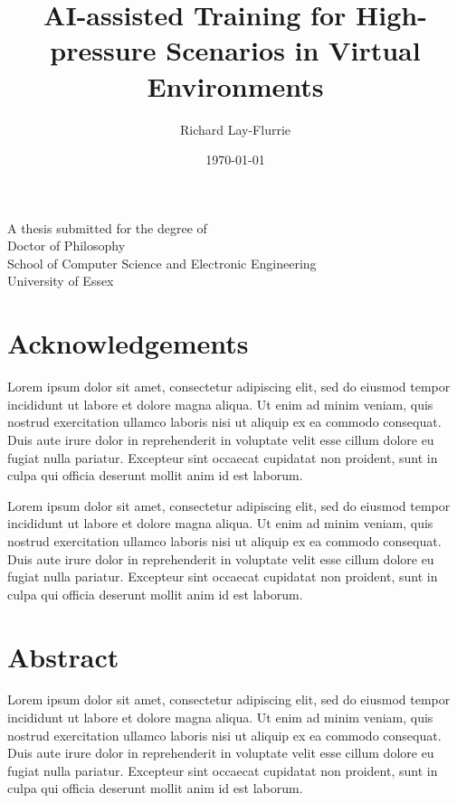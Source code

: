 \documentclass[12pt]{article}
\title{AI-assisted Training for High-pressure Scenarios in Virtual Environments}
\author{Richard Lay-Flurrie}
\date{\today}
\begin{document}
\maketitle
\thispagestyle{empty}

\begin{center}
  \vfill
  \large
  A thesis submitted for the degree of\\
  Doctor of Philosophy\\
  \vfill
  \normalsize
  School of Computer Science and Electronic Engineering\\
  University of Essex\\
  \vfill
\end{center}

\newpage

\section*{Acknowledgements}

Lorem ipsum dolor sit amet, consectetur adipiscing elit, sed do eiusmod tempor incididunt ut labore et dolore magna aliqua. Ut enim ad minim veniam, quis nostrud exercitation ullamco laboris nisi ut aliquip ex ea commodo consequat. Duis aute irure dolor in reprehenderit in voluptate velit esse cillum dolore eu fugiat nulla pariatur. Excepteur sint occaecat cupidatat non proident, sunt in culpa qui officia deserunt mollit anim id est laborum.

Lorem ipsum dolor sit amet, consectetur adipiscing elit, sed do eiusmod tempor incididunt ut labore et dolore magna aliqua. Ut enim ad minim veniam, quis nostrud exercitation ullamco laboris nisi ut aliquip ex ea commodo consequat. Duis aute irure dolor in reprehenderit in voluptate velit esse cillum dolore eu fugiat nulla pariatur. Excepteur sint occaecat cupidatat non proident, sunt in culpa qui officia deserunt mollit anim id est laborum.

\newpage

\section*{Abstract}

Lorem ipsum dolor sit amet, consectetur adipiscing elit, sed do eiusmod tempor incididunt ut labore et dolore magna aliqua. Ut enim ad minim veniam, quis nostrud exercitation ullamco laboris nisi ut aliquip ex ea commodo consequat. Duis aute irure dolor in reprehenderit in voluptate velit esse cillum dolore eu fugiat nulla pariatur. Excepteur sint occaecat cupidatat non proident, sunt in culpa qui officia deserunt mollit anim id est laborum.
\end{document}

